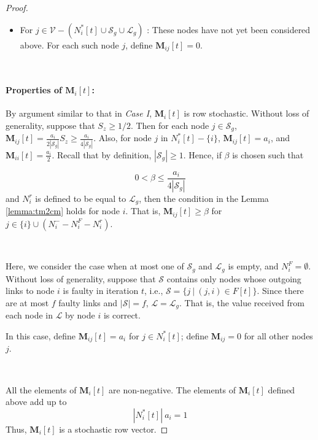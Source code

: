 \documentclass{llncs}
\newcommand{\scriptv}{\mathcal{V}}
\newcommand{\scriptl}{\mathcal{L}}
\newcommand{\scripts}{\mathcal{S}}
\newcommand{\matrixm}{\textbf{M}}
\begin{document}
\begin{proof}
\begin{itemize}
\item For $j\in \scriptv - (N_i^*[t] \cup \scripts_g \cup \scriptl_g)$ :
 These nodes have not yet been considered above.
For each such node $j$, define $\matrixm_{ij}[t] = 0$.
\end{itemize}

~

\paragraph{Properties of $\matrixm_i[t]$:}


By argument similar to that in {\em Case I}, $\matrixm_i[t]$ is row stochastic. Without loss of generality, suppose that $S_z \geq 1/2$. Then for each node $j \in \scripts_g$, $\matrixm_{ij}[t] = \frac{a_i}{2|\scripts_g|}S_z \geq \frac{a_i}{4|\scripts_g|}$. Also, for node $j$ in $N_i^*[t]-\{i\}$, $\matrixm_{ij}[t] = a_i$, and $\matrixm_{ii}[t] = \frac{a_i}{2}$. Recall that by definition, $|\scripts_g| \geq 1$. Hence, if $\beta$ is chosen such that 

\begin{equation}
\label{eq:beta-caseII}
0 < \beta \leq \frac{a_i}{4|\scripts_g|}
\end{equation}
and $N_i^r$ is defined to be equal to $\scriptl_g$, then the condition in the Lemma \ref{lemma:tm2cm} holds for node $i$. That is,
$\matrixm_{ij}[t] \geq \beta$ for $j \in \{i\} \cup (N_i^- - N_i^F - N_i^r)$. 

~







Here, we consider the case when at most one of $\scripts_g$ and $\scriptl_g$ is empty, and $N_i^F = \emptyset$. Without loss of generality, suppose that $\scripts$ contains only nodes whose outgoing links to node $i$ is faulty in iteration $t$, i.e., $\scripts = \{j~|~(j,i) \in F[t]\}$. Since there are at most $f$ faulty links and $|\scripts| = f$, $\scriptl = \scriptl_g$. That is, the value received from each node in $\scriptl$ by node $i$ is correct.

In this case, define $\matrixm_{ij}[t]=a_i$ for $j\in N_i^*[t]$;
define $\matrixm_{ij}=0$ for all other nodes $j$.


~

\noindent {\em Properties of $\matrixm_i[t]$:}


All the elements of $\matrixm_i[t]$ are non-negative.
The elements of $\matrixm_i[t]$ defined above add up to
\[
|N_i^*[t]|~a_i = 1
\]
Thus, $\matrixm_i[t]$ is a stochastic row vector.


\end{proof}
\end{document}
